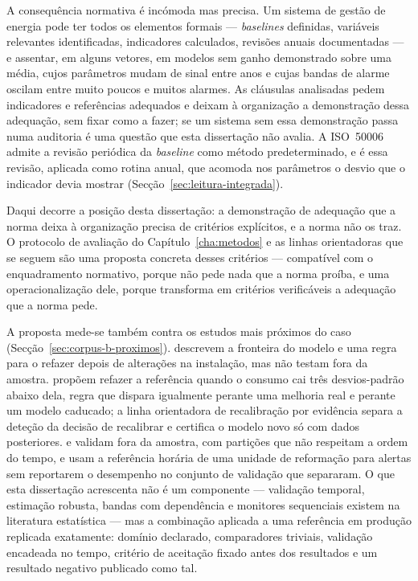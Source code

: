 A consequência normativa é incómoda mas precisa. Um sistema de gestão de
energia pode ter todos os elementos formais --- \emph{baselines} definidas,
variáveis relevantes identificadas, indicadores calculados, revisões
anuais documentadas --- e assentar, em alguns vetores, em modelos sem ganho
demonstrado sobre uma média, cujos parâmetros mudam de sinal entre anos e
cujas bandas de alarme oscilam entre muito poucos e muitos alarmes. As
cláusulas analisadas pedem indicadores e referências adequados e deixam à
organização a demonstração dessa adequação, sem fixar como a fazer; se um
sistema sem essa demonstração passa numa auditoria é uma questão que esta
dissertação não avalia. A ISO~50006 admite a revisão periódica da
\emph{baseline} como método predeterminado, e é essa revisão, aplicada
como rotina anual, que acomoda nos parâmetros o desvio que o indicador
devia mostrar (Secção~\ref{sec:leitura-integrada}).

Daqui decorre a posição desta dissertação: a demonstração de adequação que
a norma deixa à organização precisa de critérios explícitos, e a norma não
os traz. O protocolo de avaliação do Capítulo~\ref{cha:metodos} e as linhas
orientadoras que se seguem são uma proposta concreta desses critérios ---
compatível com o enquadramento normativo, porque não pede nada que a norma
proíba, e uma operacionalização dele, porque transforma em critérios
verificáveis a adequação que a norma pede.

A proposta mede-se também contra os estudos mais próximos do caso
(Secção~\ref{sec:corpus-b-proximos}). \textcite{Beisheim2019} descrevem a
fronteira do modelo e uma regra para o refazer depois de alterações na
instalação, mas não testam fora da amostra. \textcite{Yao2016} propõem
refazer a referência quando o consumo cai três desvios-padrão abaixo dela,
regra que dispara igualmente perante uma melhoria real e perante um modelo
caducado; a linha orientadora de recalibração por evidência separa a
deteção da decisão de recalibrar e certifica o modelo novo só com dados
posteriores. \textcite{Hamedi2019} e \textcite{Moghadasi2025} validam fora
da amostra, com partições que não respeitam a ordem do tempo, e
\textcite{Velazquez2013} usam a referência horária de uma unidade de
reformação para alertas sem reportarem o desempenho no conjunto de
validação que separaram. O que esta dissertação acrescenta não é um
componente --- validação temporal, estimação robusta, bandas com dependência
e monitores sequenciais existem na literatura estatística --- mas a
combinação aplicada a uma referência em produção replicada exatamente:
domínio declarado, comparadores triviais, validação encadeada no tempo,
critério de aceitação fixado antes dos resultados e um resultado negativo
publicado como tal.

